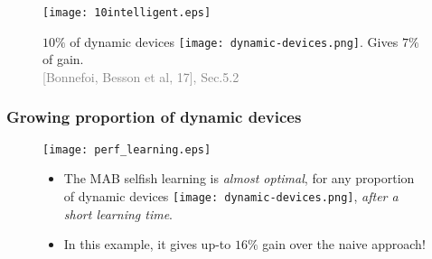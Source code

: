 \begin{frameO}

    \begin{figure}[h!]
        \centering
        \texttt{[image: 10intelligent.eps]}

            $10\%$ of dynamic devices \texttt{[image: dynamic-devices.png]}. Gives $7\%$ of gain.\\
            {\small \textcolor{gray}{[Bonnefoi, Besson et al, 17], Sec.5.2}}
    \end{figure}

\end{frameO}









\subsubsection{Growing proportion of dynamic devices}

\begin{frameO}

    \begin{figure}[h!]
        \centering
        \texttt{[image: perf\_learning.eps]}

            \begin{itemize}
                \item
                The MAB selfish learning is \emph{almost optimal}, for any proportion of dynamic devices \texttt{[image: dynamic-devices.png]}, \emph{after a short learning time}.

                \item
                In this example, it gives up-to $16\%$ gain over the naive approach!
            \end{itemize}
    \end{figure}

\end{frameO}


